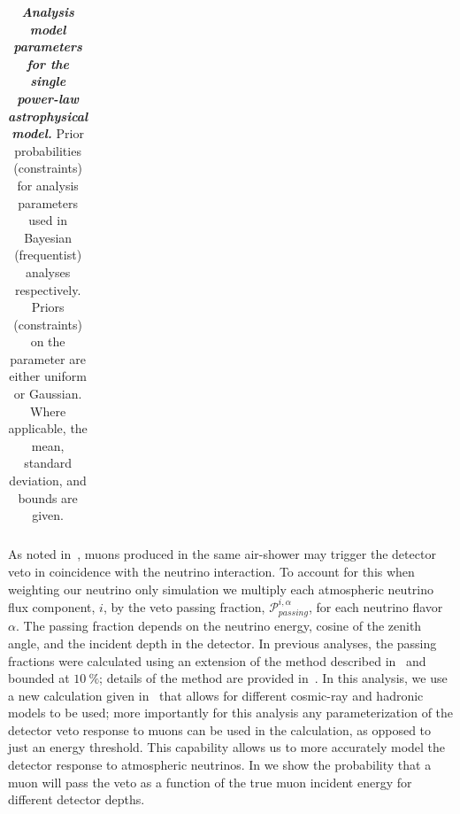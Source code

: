 \begin{table}[thb]
\begin{minipage}{\linewidth}
\begin{tabular}{l rrr}
		\end{tabular}
	\end{minipage}
	\begin{minipage}{\linewidth}
		\internallinenumbers
		\caption{\textbf{\textit{Analysis model parameters for the single power-law astrophysical model.}} Prior probabilities (constraints) for analysis parameters used in Bayesian (frequentist) analyses respectively.
			Priors (constraints) on the parameter are either uniform or Gaussian.
			Where applicable, the mean, standard deviation, and bounds are given.}\vspace{-6mm}\label{tbl:priors}
	\end{minipage}
\end{table}

As noted in~\cite{Schonert:2008is}, muons produced in the same air-shower may trigger the detector veto in coincidence with the neutrino interaction.
To account for this when weighting our neutrino only simulation we multiply each atmospheric neutrino flux component, $i$, by the veto passing fraction, $\mathcal{P}^{i,\alpha}_{passing}$, for each neutrino flavor $\alpha$.
The passing fraction depends on the neutrino energy, cosine of the zenith angle, and the incident depth in the detector.
In previous analyses, the passing fractions were calculated using an extension of the method described in~\cite{Schonert:2008is} and bounded at $\SI{10}\percent$; details of the method are provided in~\cite{Aartsen:2013jdh}.
In this analysis, we use a new calculation given in~\cite{Arguelles:2018awr} that allows for different cosmic-ray and hadronic models to be used; more importantly for this analysis any parameterization of the detector veto response to muons can be used in the calculation, as opposed to just an energy threshold.
This capability allows us to more accurately model the detector response to atmospheric neutrinos.
In  we show the probability that a muon will pass the veto as a function of the true muon incident energy for different detector depths.
